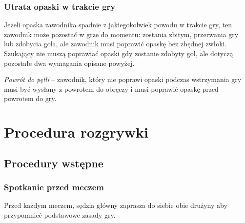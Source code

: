 \documentclass[12pt]{article}
\begin{document}
\subsubsection{Utrata opaski w trakcie gry}
Jeżeli opaska zawodnika
spadnie z jakiegokolwiek powodu w trakcie gry, ten zawodnik może
pozostać w grze do momentu: zostania zbitym, przerwania gry lub zdobycia
gola, ale zawodnik musi poprawić opaskę bez zbędnej zwłoki. Szukający
nie muszą poprawiać opaski gdy zostanie zdobyty gol, ale dotyczą
pozostałe dwa wymagania opisane powyżej.

\emph{Powrót do pętli} -- zawodnik, który nie poprawi opaski podczas
wstrzymania gry musi być wysłany z powrotem do obręczy i musi poprawić
opaskę przed powrotem do gry.

\pagebreak
\section{Procedura rozgrywki}

\subsection{Procedury wstępne}

\subsubsection{Spotkanie przed meczem}
Przed każdym meczem, sędzia
główny zaprasza do siebie obie drużyny aby przypomnieć podstawowe zasady
gry.
\end{document}
